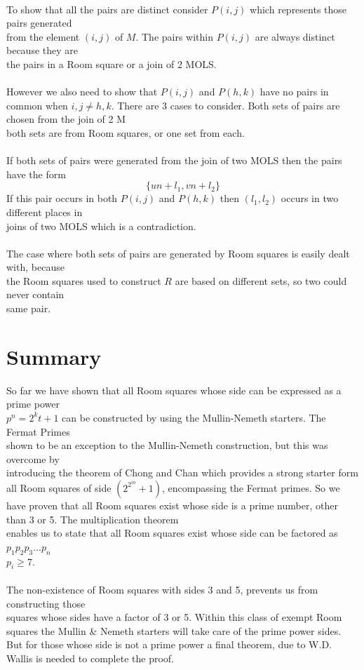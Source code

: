 \documentclass[
  12pt,
  a4paper]{book}
\begin{document}
~\\
To show that all the pairs are distinct consider \(P(i,j)\) which
represents those pairs generated\\
from the element \((i,j)\) of \(M\). The pairs within \(P(i,j)\) are
always distinct because they are\\
the pairs in a Room square or a join of 2 MOLS.\\
~\\
However we also need to show that \(P(i,j)\) and \(P(h,k)\) have no
pairs in common when \(i,j \neq h,k\). There are 3 cases to consider.
Both sets of pairs are chosen from the join of 2 M\\
both sets are from Room squares, or one set from each.\\
~\\
If both sets of pairs were generated from the join of two MOLS then the
pairs have the form\[\{un+l_1,vn+l_2\}\] If this pair occurs in both
\(P(i,j)\) and \(P(h,k)\) then \((l_1,l_2)\) occurs in two different
places in\\
joins of two MOLS which is a contradiction.\\
~\\
The case where both sets of pairs are generated by Room squares is
easily dealt with, because\\
the Room squares used to construct \(R\) are based on different sets, so
two could never contain\\
same pair.

\hypertarget{summary}{%
\section{Summary}\label{summary}}

So far we have shown that all Room squares whose side can be expressed
as a prime power\\
\(p^n=2^kt+1\) can be constructed by using the Mullin-Nemeth starters.
The Fermat Primes\\
shown to be an exception to the Mullin-Nemeth construction, but this was
overcome by\\
introducing the theorem of Chong and Chan which provides a strong
starter form all Room squares of side \((2^{2^m}+1)\), encompassing the
Fermat primes. So we have proven that all Room squares exist whose side
is a prime number, other than 3 or 5. The multiplication theorem\\
enables us to state that all Room squares exist whose side can be
factored as \(p_1p_2p_3...p_n\)\\
\(p_i \geq 7\).\\
~\\
The non-existence of Room squares with sides 3 and 5, prevents us from
constructing those\\
squares whose sides have a factor of 3 or 5. Within this class of exempt
Room squares the Mullin \& Nemeth starters will take care of the prime
power sides. But for those whose side is not a prime power a final
theorem, due to W.D. Wallis is needed to complete the proof.
\end{document}
